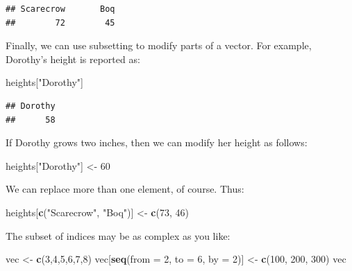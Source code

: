 \documentclass[]{book}
\makeatletter
\newenvironment{Shaded}{\begin{snugshade}}{\end{snugshade}}
\newcommand{\KeywordTok}[1]{\textcolor[rgb]{0.13,0.29,0.53}{\textbf{{#1}}}}
\newcommand{\DataTypeTok}[1]{\textcolor[rgb]{0.13,0.29,0.53}{{#1}}}
\newcommand{\DecValTok}[1]{\textcolor[rgb]{0.00,0.00,0.81}{{#1}}}
\newcommand{\StringTok}[1]{\textcolor[rgb]{0.31,0.60,0.02}{{#1}}}
\newcommand{\NormalTok}[1]{{#1}}
\newenvironment{kframe}{%
\medskip{}
\setlength{\fboxsep}{.8em}
 \def\at@end@of@kframe{}%
 \ifinner\ifhmode%
  \def\at@end@of@kframe{\end{minipage}}%
  \begin{minipage}{\columnwidth}%
 \fi\fi%
 \def\FrameCommand##1{\hskip\@totalleftmargin \hskip-\fboxsep
 \colorbox{shadecolor}{##1}\hskip-\fboxsep
     \hskip-\linewidth \hskip-\@totalleftmargin \hskip\columnwidth}%
 \MakeFramed {\advance\hsize-\width
   \@totalleftmargin\z@ \linewidth\hsize
   \@setminipage}}%
 {\par\unskip\endMakeFramed%
 \at@end@of@kframe}
\renewenvironment{Shaded}{\begin{kframe}}{\end{kframe}}
\theoremstyle{definition}
\theoremstyle{definition}
\theoremstyle{remark}
\makeatother
\begin{document}
\begin{verbatim}
## Scarecrow       Boq 
##        72        45
\end{verbatim}

Finally, we can use subsetting to modify parts of a vector. For example,
Dorothy's height is reported as:

\begin{Shaded}
\begin{Highlighting}[]
\NormalTok{heights[}\StringTok{"Dorothy"}\NormalTok{]}
\end{Highlighting}
\end{Shaded}

\begin{verbatim}
## Dorothy 
##      58
\end{verbatim}

If Dorothy grows two inches, then we can modify her height as follows:

\begin{Shaded}
\begin{Highlighting}[]
\NormalTok{heights[}\StringTok{"Dorothy"}\NormalTok{] <-}\StringTok{ }\DecValTok{60}
\end{Highlighting}
\end{Shaded}

We can replace more than one element, of course. Thus:

\begin{Shaded}
\begin{Highlighting}[]
\NormalTok{heights[}\KeywordTok{c}\NormalTok{(}\StringTok{"Scarecrow"}\NormalTok{, }\StringTok{"Boq"}\NormalTok{)] <-}\StringTok{ }\KeywordTok{c}\NormalTok{(}\DecValTok{73}\NormalTok{, }\DecValTok{46}\NormalTok{)}
\end{Highlighting}
\end{Shaded}

The subset of indices may be as complex as you like:

\begin{Shaded}
\begin{Highlighting}[]
\NormalTok{vec <-}\StringTok{ }\KeywordTok{c}\NormalTok{(}\DecValTok{3}\NormalTok{,}\DecValTok{4}\NormalTok{,}\DecValTok{5}\NormalTok{,}\DecValTok{6}\NormalTok{,}\DecValTok{7}\NormalTok{,}\DecValTok{8}\NormalTok{)}
\NormalTok{vec[}\KeywordTok{seq}\NormalTok{(}\DataTypeTok{from =} \DecValTok{2}\NormalTok{, }\DataTypeTok{to =} \DecValTok{6}\NormalTok{, }\DataTypeTok{by =} \DecValTok{2}\NormalTok{)] <-}\StringTok{ }\KeywordTok{c}\NormalTok{(}\DecValTok{100}\NormalTok{, }\DecValTok{200}\NormalTok{, }\DecValTok{300}\NormalTok{)}
\NormalTok{vec}
\end{Highlighting}
\end{Shaded}
\end{document}
